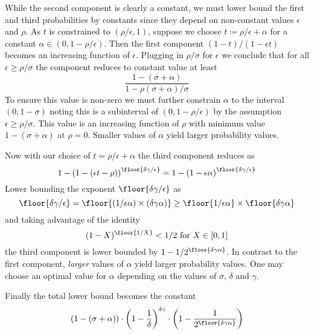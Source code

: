 While the second component is clearly a constant, we must lower bound the first and third probabilities by constants since they depend on non-constant values $\epsilon$ and $\rho$.
As $t$ is constrained to $(\rho/\epsilon,1)$, suppose we choose $t\coloneq\rho/\epsilon+\alpha$ for a constant $\alpha\in(0,1-\rho/\epsilon)$.
Then the first component $(1-t)/(1-\epsilon t)$ becomes an increasing function of $\epsilon$.
Plugging in $\rho/\sigma$ for $\epsilon$ we conclude that for all $\epsilon\geq\rho/\sigma$ the component reduces to constant value at least
\begin{equation}
    \frac{1 - (\sigma + \alpha)}{1 - \rho(\sigma + \alpha)/\sigma}
\end{equation}
To ensure this value is non-zero we must further constrain $\alpha$ to the interval $(0,1-\sigma)$ noting this is a subinterval of $(0,1-\rho/\epsilon)$  by the assumption $\epsilon\geq\rho/\sigma$.
This value is an increasing function of $\rho$ with minimum value $1-(\sigma+\alpha)$ at $\rho=0$.
Smaller values of $\alpha$ yield larger probability values.

Now with our choice of $t=\rho/\epsilon+\alpha$ the third component reduces as
\begin{equation}
    1 - \left(1 - (\epsilon t - \rho)\right)^\floor{\delta\gamma/\epsilon}
    = 1 - \left(1 - \epsilon\alpha\right)^\floor{\delta\gamma/\epsilon}
\end{equation}
Lower bounding the exponent $\floor{\delta\gamma/\epsilon}$ as 
\begin{equation}
    \floor{\delta\gamma/\epsilon}
    = \floor{(1/\epsilon\alpha)\times(\delta\gamma\alpha)}
    \geq \floor{1/\epsilon\alpha}\times\floor{\delta\gamma\alpha}
\end{equation}
and taking advantage of the identity
\begin{equation}
    (1-X)^\floor{1/X} < 1/2 \text{ for } X\in[0,1]
\end{equation}
the third component is lower bounded by $1-1/2^\floor{\delta\gamma\alpha}$.
In contrast to the first component, \emph{larger} values of $\alpha$ yield larger probability values.
One may choose an optimal value for $\alpha$ depending on the values of $\sigma$, $\delta$ and $\gamma$.

Finally the total lower bound becomes the constant
\begin{equation}
    \left(1 - (\sigma + \alpha)\right)\cdot
    \left(1-\frac{1}{\delta}\right)^{\delta\gamma}\cdot
    \left(1 - \frac{1}{2^\floor{\delta\gamma\alpha}}\right)
\end{equation}
